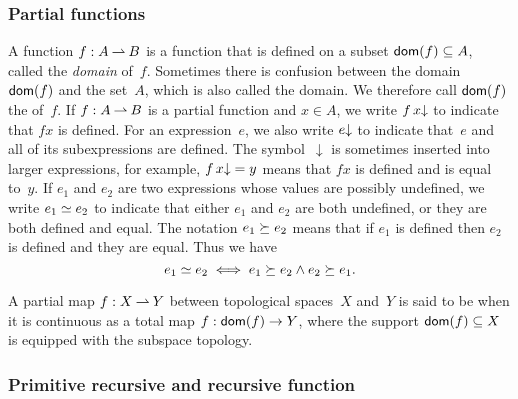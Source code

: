\subsubsection*{Partial functions}

A  function $f: A \mathbin{\rightharpoonup} B$ is a function that is defined on a subset
$\mathsf{dom}(f) \subseteq A$, called the \emph{domain} of~$f$. Sometimes
there is confusion between the domain~$\mathsf{dom}(f)$ and the set~$A$, which
is also called the domain. We therefore call $\mathsf{dom}(f)$ the
 of~$f$. If $f: A \mathbin{\rightharpoonup} B$ is a partial function and $x
\in A$, we write $f\, x{\downarrow}$ to indicate that $f x$ is defined.
For an expression~$e$, we also write $e{\downarrow}$ to indicate
that~$e$ and all of its subexpressions are defined. The
symbol~$\downarrow$ is sometimes inserted into larger expressions, for
example, $f\, x{\downarrow} = y$ means that $f x$ is defined and is
equal to~$y$. If $e_1$ and $e_2$ are two expressions whose values are
possibly undefined, we write $e_1 \simeq e_2$ to indicate that either
$e_1$ and $e_2$ are both undefined, or they are both defined and
equal. The notation $e_1 \succeq e_2$ means that if $e_1$ is defined
then $e_2$ is defined and they are equal. Thus we have
%
\begin{equation*}
  e_1 \simeq e_2 \iff e_1 \succeq e_2 \land e_2 \succeq e_1.
\end{equation*}

A partial map $f: X \mathbin{\rightharpoonup} Y$ between topological spaces~$X$ and~$Y$
is said to be  when it is continuous as a total map
$f: \mathsf{dom}(f) \to Y$, where the support $\mathsf{dom}(f) \subseteq
X$ is equipped with the subspace topology.



\subsubsection*{Primitive recursive and recursive function}

